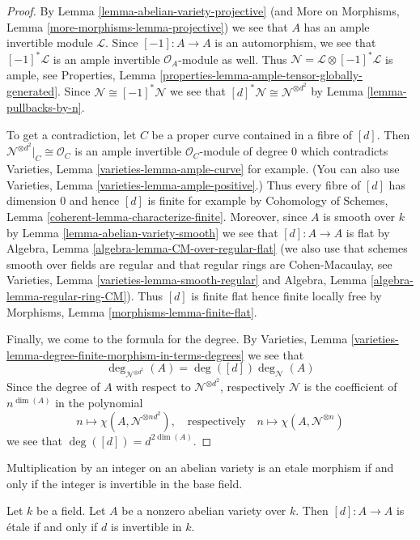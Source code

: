 \begin{proof}
By Lemma \ref{lemma-abelian-variety-projective}
(and More on Morphisms, Lemma \ref{more-morphisms-lemma-projective})
we see that $A$ has an ample invertible module $\mathcal{L}$.
Since $[-1] : A \to A$ is an automorphism, we see that
$[-1]^*\mathcal{L}$ is an ample invertible $\mathcal{O}_A$-module
as well. Thus $\mathcal{N} = \mathcal{L} \otimes [-1]^*\mathcal{L}$
is ample, see
Properties, Lemma \ref{properties-lemma-ample-tensor-globally-generated}.
Since $\mathcal{N} \cong [-1]^*\mathcal{N}$ we see that
$[d]^*\mathcal{N} \cong \mathcal{N}^{\otimes d^2}$ by
Lemma \ref{lemma-pullbacks-by-n}.

\medskip\noindent
To get a contradiction, let $C$ be a proper curve contained in a
fibre of $[d]$. Then $\mathcal{N}^{\otimes d^2}|_C \cong \mathcal{O}_C$
is an ample invertible $\mathcal{O}_C$-module of degree $0$ which
contradicts Varieties, Lemma \ref{varieties-lemma-ample-curve} for example.
(You can also use Varieties, Lemma \ref{varieties-lemma-ample-positive}.)
Thus every fibre of $[d]$ has dimension $0$ and hence $[d]$ is finite
for example by Cohomology of Schemes, Lemma
\ref{coherent-lemma-characterize-finite}.
Moreover, since $A$ is smooth over $k$ by
Lemma \ref{lemma-abelian-variety-smooth}
we see that $[d] : A \to A$ is flat by
Algebra, Lemma \ref{algebra-lemma-CM-over-regular-flat}
(we also use that schemes smooth over fields are regular and that
regular rings are Cohen-Macaulay, see
Varieties, Lemma \ref{varieties-lemma-smooth-regular} and
Algebra, Lemma \ref{algebra-lemma-regular-ring-CM}).
Thus $[d]$ is finite flat hence finite locally free by
Morphisms, Lemma \ref{morphisms-lemma-finite-flat}.

\medskip\noindent
Finally, we come to the formula for the degree. By
Varieties, Lemma \ref{varieties-lemma-degree-finite-morphism-in-terms-degrees}
we see that
$$
\deg_{\mathcal{N}^{\otimes d^2}}(A) = \deg([d]) \deg_\mathcal{N}(A)
$$
Since the degree of $A$ with respect to
$\mathcal{N}^{\otimes d^2}$, respectively $\mathcal{N}$
is the coefficient of $n^{\dim(A)}$ in the polynomial
$$
n \longmapsto \chi(A, \mathcal{N}^{\otimes nd^2}),\quad
\text{respectively}\quad n \longmapsto \chi(A, \mathcal{N}^{\otimes n})
$$
we see that $\deg([d]) = d^{2 \dim(A)}$.
\end{proof}

\begin{lemma}
\label{lemma-abelian-variety-multiplication-by-d-etale}
\begin{slogan}
Multiplication by an integer on an abelian variety is an etale morphism
if and only if the integer is invertible in the base field.
\end{slogan}
Let $k$ be a field. Let $A$ be a nonzero abelian variety over $k$.
Then $[d] : A \to A$ is \'etale if and only if $d$ is invertible in $k$.
\end{lemma}

